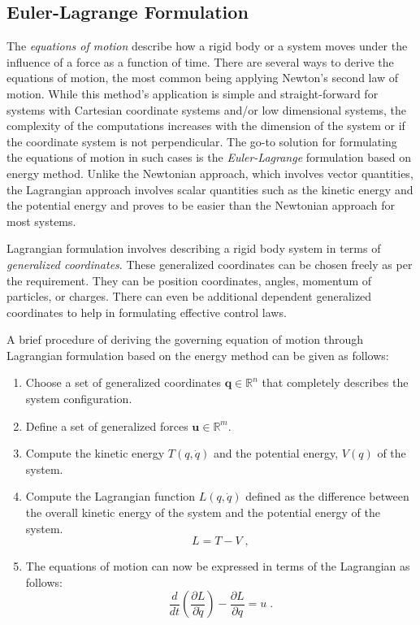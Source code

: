 \subsection{Euler-Lagrange Formulation}
\label{sec:Lagrange}
The \textit{equations of motion} describe how a rigid body or a system moves under the influence of a force as a function of time. There are several ways to derive the equations of motion, the most common being applying Newton's second law of motion. While this method's application is simple and straight-forward for systems with Cartesian coordinate systems and/or low dimensional systems, the complexity of the computations increases with the dimension of the system or if the coordinate system is not perpendicular. The go-to solution for formulating the equations of motion in such cases is the \textit{Euler-Lagrange} formulation based on energy method. Unlike the Newtonian approach, which involves vector quantities, the Lagrangian approach involves scalar quantities such as the kinetic energy and the potential energy and proves to be easier than the Newtonian approach for most systems.\par
Lagrangian formulation involves describing a rigid body system in terms of \textit{generalized coordinates}. These generalized coordinates can be chosen freely as per the requirement. They can be position coordinates, angles, momentum of particles, or charges. There can even be additional dependent generalized coordinates to help in formulating effective control laws. \par
A brief procedure of deriving the governing equation of motion through Lagrangian formulation based on the energy method can be given as follows:
\begin{enumerate}

    \item Choose a set of generalized coordinates $\mathbf{q} \in \mathbb{R}^n$ that completely describes the system configuration.
    
    \item Define a set of generalized forces $\mathbf{u} \in \mathbb{R}^m$.
    
    \item Compute the kinetic energy $T(q,\Dot{q})$ and the potential energy, $V(q)$ of the system.
    
    \item Compute the Lagrangian function $ L(q,\Dot{q})$ defined as the difference between the overall kinetic energy of the system and the potential energy of the system.
        \begin{equation}
        L = T - V\;,
        \end{equation}
        
    \item The equations of motion can now be expressed in terms of the Lagrangian as follows:
    \begin{equation}
    \label{eq:LagrangeEqn}
    \frac{d}{dt}\left(\frac{\partial{L}}{\partial{\Dot{q}}}\right) - \frac{\partial{L}}{\partial{q}} = u\;.     
    \end{equation}
\end{enumerate}
\par

